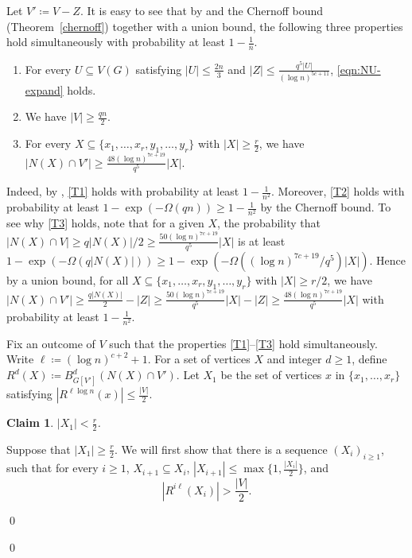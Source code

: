 \documentclass[10pt]{article}
\theoremstyle{plain}
\numberwithin{theorem}{section}
\newtheorem{claim}{Claim}[theorem]
\theoremstyle{definition}
\theoremstyle{remark}
\renewenvironment{proof}[1][]{\begin{trivlist}
\item[\hspace{\labelsep}{\bf\noindent Proof#1.\/}] }{\qed\end{trivlist}}
\renewcommand{\setminus}{-}
\theoremstyle{plain}
\begin{document}
		\begin{proof}
			Let $V' \coloneqq V \setminus Z$. It is easy to see that by  and the Chernoff bound (Theorem~\ref{chernoff}) together with a union bound, the following three properties hold simultaneously with probability at least $1 - \frac{1}{n}$. 
            
			\begin{enumerate}[label = \rm(T\arabic*)]
				\item \label{T1}
					For every $U \subseteq V(G)$ satisfying $|U| \le \frac{2n}{3}$ and $|Z| \le \frac{q^5|U|}{(\log n)^{5c+11}}$, \eqref{eqn:NU-expand} holds.
				\item \label{T2}
					We have $|V| \ge \frac{qn}{2}$.
				\item \label{T3}
					For every
					$X \subseteq \{x_1, \ldots, x_r, y_1, \ldots, y_r\}$ with $|X| \ge \frac{r}{2}$, we have $|N(X) \cap V'| \ge \frac{48 (\log n)^{7c+19}}{q^5} |X|$.
		      \end{enumerate}

              Indeed, by , \ref{T1} holds with probability at least $1 - \frac{1}{n^2}$. Moreover, \ref{T2} holds with probability at least $1 - \exp(-\Omega(qn)) \ge 1 - \frac{1}{n^2}$ by the Chernoff bound. To see why \ref{T3} holds, note that for a given $X$, the probability that $|N(X) \cap V| \ge q|N(X)|/2 \ge \frac{50 (\log n)^{7c+19}}{q^5}|X|$ is at least $1 - \exp(-\Omega(q|N(X)|)) \ge 1 - \exp(-\Omega((\log n)^{7c+19}/q^5)|X|)$. Hence by a union bound, for all $X \subseteq \{x_1, \ldots, x_r, y_1, \ldots, y_r\}$ with $|X| \ge r/2$, we have  $|N(X) \cap V'| \ge \frac{q|N(X)|}{2}-|Z| \ge \frac{50 (\log n)^{7c+19}}{q^5}|X| - |Z| \ge \frac{48 (\log n)^{7c+19}}{q^5}|X|$ with probability at least $1 - \frac{1}{n^2}$.

			Fix an outcome of $V$ such that the properties \ref{T1}--\ref{T3} hold simultaneously.
			Write $\ell \coloneqq (\log n)^{c+2}+1$.
			For a set of vertices $X$ and integer $d \ge 1$, define $R^d(X) \coloneqq B^d_{G[V']}(N(X) \cap V')$. Let $X_1$ be the set of vertices $x$ in $\{x_1, \ldots, x_r\}$ satisfying $|R^{\ell \log n}(x)| \le \frac{|V|}{2}$. 
			\begin{claim}
            \label{claim:X1atmostr2}
				$|X_1| < \frac{r}{2}$.
			\end{claim}
			\begin{proof}
				Suppose that $|X_1| \ge \frac{r}{2}$. We will first show that there is a sequence $(X_i)_{i \ge 1}$, such that for every $i \ge 1$, $X_{i+1} \subseteq X_{i}$, $|X_{i+1}| \le \max\{1, \frac{|X_i|}{2}\}$, and 
				\begin{equation} \label{eqn:R}
					\left|R^{i\ell}(X_i)\right| > \frac{|V|}{2}. 
				\end{equation}
				 


\end{proof}
\end{proof}
\end{document}
